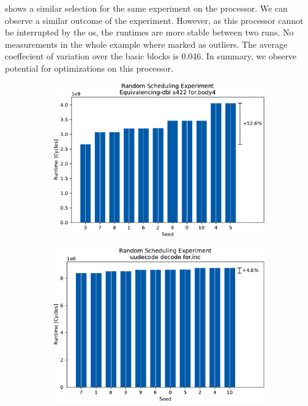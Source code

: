  shows a similar selection for the same experiment on the \aurora processor.
We can observe a similar outcome of the experiment.
However, as this processor cannot be interrupted by the \ac{os}, the runtimes are more stable between two runs.
No measurements in the whole example where marked as outliers.
The average coeffecient of variation over the basic blocks is 0.046.
In summary, we observe potential for optimizations on this processor.
\begin{figure}
    \begin{subfigure}{0.45\textwidth}
        \includegraphics[width=\textwidth]{img/random-scheduling-experiment-aurora-collected/Equivalencing-dbl-crop.pdf}
        \caption{}
        \label{fig:eval:rndm:aurora:a}
    \end{subfigure}
    \hfill
    \begin{subfigure}{0.45\textwidth}
        \includegraphics[width=\textwidth]{img/random-scheduling-experiment-aurora-collected/uudecode-crop.pdf}

\end{subfigure}
\end{figure}

